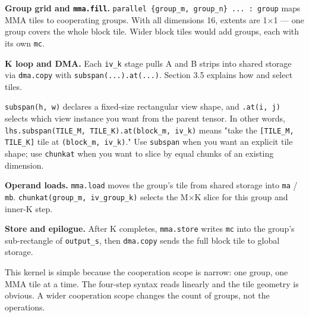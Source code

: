 \textbf{Group grid and \texttt{mma.fill}.} \texttt{parallel \{group\_\allowbreak{}m, group\_\allowbreak{}n\} .\allowbreak{}.\allowbreak{}.\allowbreak{} :\allowbreak{} group} maps MMA tiles to cooperating groups. With all dimensions 16, extents are 1\(\times\)1 --- one group covers the whole block tile. Wider block tiles would add groups, each with its own \texttt{mc}.

\textbf{K loop and DMA.} Each \texttt{iv\_k} stage pulls A and B strips into shared storage via \texttt{dma.copy} with \texttt{subspan(.\allowbreak{}.\allowbreak{}.\allowbreak{}).\allowbreak{}at(.\allowbreak{}.\allowbreak{}.\allowbreak{})}. Section 3.5 explains how \co@subspan@ and \co@chunkat@ select tiles.

\begin{keypoint}
\texttt{subspan(h, w)} declares a fixed-size rectangular view shape, and \texttt{.at(i, j)} selects which view instance you want from the parent tensor. In other words, \texttt{lhs.\allowbreak{}subspan(TILE\_\allowbreak{}M, TILE\_\allowbreak{}K).\allowbreak{}at(block\_\allowbreak{}m, iv\_\allowbreak{}k)} means "take the \texttt{[TILE\_\allowbreak{}M, TILE\_\allowbreak{}K]} tile at \texttt{(block\_\allowbreak{}m, iv\_\allowbreak{}k)}." Use \texttt{subspan} when you want an explicit tile shape; use \texttt{chunkat} when you want to slice by equal chunks of an existing dimension.

\end{keypoint}

\textbf{Operand loads.} \texttt{mma.load} moves the group's tile from shared storage into \texttt{ma} / \texttt{mb}. \texttt{chunkat(group\_\allowbreak{}m, iv\_\allowbreak{}group\_\allowbreak{}k)} selects the M\(\times\)K slice for this group and inner-K step.

\textbf{Store and epilogue.} After K completes, \texttt{mma.store} writes \texttt{mc} into the group's sub-rectangle of \texttt{output\_s}, then \texttt{dma.copy} sends the full block tile to global storage.

This kernel is simple because the cooperation scope is narrow: one group, one MMA tile at a time. The four-step syntax reads linearly and the tile geometry is obvious. A wider cooperation scope changes the count of groups, not the operations.
